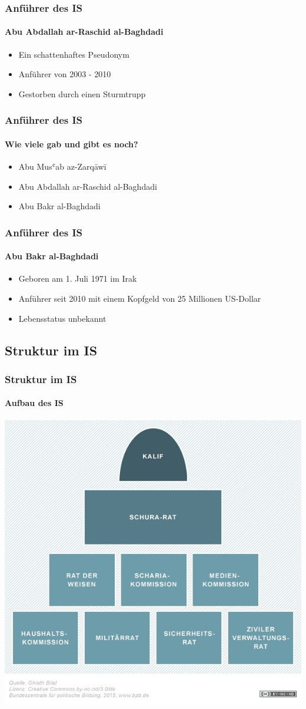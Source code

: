 \documentclass[10pt,a4paper]{beamer}
\begin{document}
\begin{frame}
\frametitle{Anführer des IS}
\framesubtitle{Abu Abdallah ar-Raschid al-Baghdadi}
\begin{itemize}
	\item Ein schattenhaftes Pseudonym 
	\pause
	\item Anführer von 2003 - 2010
	\pause
	\item Gestorben durch einen Sturmtrupp
\end{itemize}
\end{frame}

\begin{frame}
\frametitle{Anführer des IS}
\framesubtitle{Wie viele gab und gibt es noch?}
\begin{itemize}
	\item Abu Musʿab az-Zarqāwī
	\item Abu Abdallah ar-Raschid al-Baghdadi
	\item Abu Bakr al-Baghdadi
\end{itemize}
\end{frame}

\begin{frame}
\frametitle{Anführer des IS}
\framesubtitle{Abu Bakr al-Baghdadi}
\begin{itemize}
\item Geboren am 1. Juli 1971 im Irak
\pause
\item Anführer seit 2010 mit einem Kopfgeld von 25 Millionen US-Dollar
\pause
\item Lebensstatus unbekannt
\end{itemize}
\end{frame}

\subsection{Struktur im IS}
\begin{frame}
\frametitle{Struktur im IS}
\framesubtitle{Aufbau des IS}
\includegraphics[width=0.7\linewidth]{struktur}
\end{frame}
\end{document}
